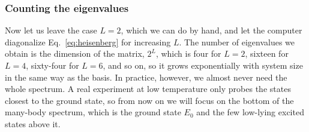 \documentclass[lecture_notes.tex]{subfiles}
\begin{document}
\subsubsection{Counting the eigenvalues}
Now let us leave the case $L=2$, which we can do by hand, and let the computer diagonalize
Eq.~\eqref{eq:heisenberg} for increasing $L$. The number of eigenvalues we obtain is the dimension of
the matrix, $2^L$, which is four for $L=2$, sixteen for $L=4$, sixty-four for $L=6$, and so on, so it
grows exponentially with system size in the same way as the basis. In practice, however, we almost
never need the whole spectrum. A real experiment at low temperature only probes the states closest
to the ground state, so from now on we will focus on the bottom of the many-body spectrum, which is
the ground state $E_0$ and the few low-lying excited states above it.
\end{document}
